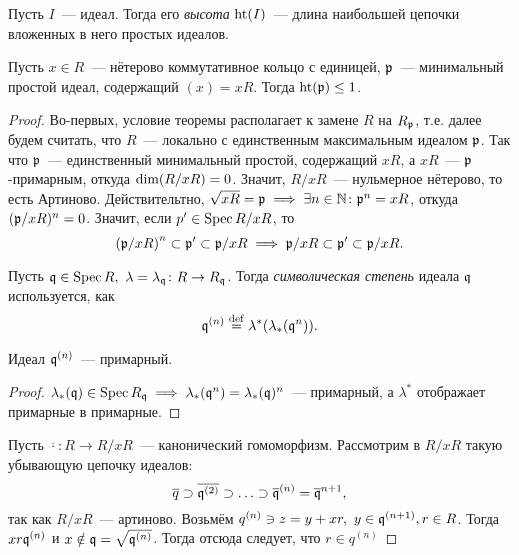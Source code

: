 	\begin{definition} 
		Пусть $I$~--- идеал. Тогда  его \emph{высота} $\Ht(I)$~--- длина наибольшей цепочки вложенных в него простых идеалов. 
	\end{definition}

	\begin{theorem}\label{hauptidealsatz}
	 	Пусть $x \in R$~--- нётерово коммутативное кольцо с единицей, $\fp$~--- минимальный простой идеал, содержащий $(x) = xR$. Тогда $\Ht(\fp) \le 1$. 	 
	 \end{theorem}  
	 \begin{proof}
	 	Во-первых, условие теоремы располагает к замене $R$ на $R_{\fp}$, т.е. далее будем считать, что $R$~--- локально с единственным максимальным идеалом $\fp$. Так что $\fp$~--- единственный минимальный простой, содержащий $xR$, а $xR$~--- $\fp$-примарным, откуда $\dim\lr*{R/xR} = 0$. Значит, $R/xR$~--- нульмерное нётерово, то есть Артиново. Действительтно, $\sqrt{xR} = \fp \implies \exists n \in \N \colon \fp^n = xR$, откуда $(\fp/xR)^n = 0$. Значит, если $p' \in \Spec{R/xR}$, то 
	 	\[
	 		\lr*{\fp/xR}^n \subset \fp' \subset \fp/xR \implies \fp/xR \subset \fp' \subset \fp/xR.
	 	\]

	 	\begin{definition} 
	 		Пусть $\fq \in \Spec{R}, \ \lambda = \lambda_{\fq}\colon R \to R_{\fq}$. Тогда \emph{символическая степень} идеала $\fq$ используется, как 
	 		\[
	 			\fq^{(n)} \eqdef \lambda^*\lr*{\lambda_*(\fq^n)}.
	 		\]
	 	\end{definition}

	 	\begin{lemma} 
	 		Идеал $\fq^{(n)}$~--- примарный. 
	 	\end{lemma}

	 	\begin{proof}
	 		$\lambda_{*}(\fq) \in \Spec{R_{\fq}} \implies \lambda_{*}(\fq^n) = \lambda_{*}(\fq)^n$~--- примарный, а $\lambda^*$ отображает примарные в примарные.  
	 	\end{proof}

	 	Пусть $\overline{\cdot}\colon R \to R/xR$~--- канонический гомоморфизм. Рассмотрим в $R/xR$ такую убывающую цепочку идеалов: 
	 	\[
	 		\overline{q} \supset \overline{\fq^{(2)}} \supset \ldots \supset \overline{\fq}^{(n)} = \overline{\fq}^{n + 1},
	 	\]
	 	так как $R/xR$~--- артиново. Возьмём $q^{(n)} \ni z = y + xr, \ y \in \fq^{(n + 1)}, r \in R$. Тогда $xr \fq^{(n)}$ и $x \notin \fq = \sqrt{\fq^{(n)}}$. Тогда отсюда следует, что $r \in q^{(n)}$



\end{proof}
